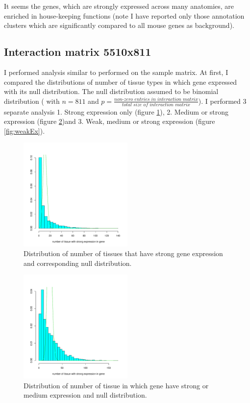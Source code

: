 \documentclass{article}
\begin{document}
It seems the genes, which are strongly expressed across many anatomies, are enriched in house-keeping functions (note I have reported only those annotation clusters which
are significantly compared to all mouse genes as background). 


\subsection{Interaction matrix 5510x811}

I performed analysis similar to performed on the sample matrix. At first, I compared the distributions of number of tissue types in which gene
expressed with its null distribution. The null distribution assumed to be binomial distribution ( with $n = 811$ and $p = \frac{  \textit{non-zero entries in interaction matrix}}{\textit{total size of interaction matrix}}$). I performed 3 separate analysis 1.  Strong expression only (figure \ref{fig:strongEx}), 2. Medium or strong expression (figure \ref{fig:mediumEx})and 3. Weak, medium or strong expression (figure \ref{fig:weakEx}).

\begin{figure}[ht]
	\begin{center}
		\includegraphics[width=0.5\textwidth]{stronglyExpressed.pdf}
	\end{center}
	\caption{ Distribution of number of tissues that have strong gene expression and corresponding null distribution.}
	\label{fig:strongEx}
\end{figure}

\begin{figure}[ht]
	\begin{center}
		\includegraphics[width=0.5\textwidth]{mediumExpressed.pdf}
	\end{center}
	\caption{ Distribution of number of tissue in which gene have strong or medium expression and null distribution.}
	\label{fig:mediumEx}
\end{figure}
\end{document}
